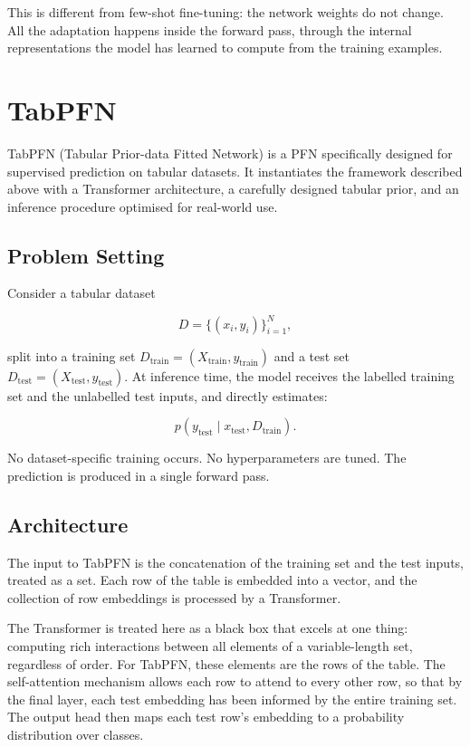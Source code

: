 \documentclass[12pt]{article}
\begin{document}
This is different from few-shot fine-tuning: the network weights do not change. All the adaptation happens inside the forward pass, through the internal representations the model has learned to compute from the training examples.

\section{TabPFN}

TabPFN (Tabular Prior-data Fitted Network) \cite{hollmann2023tabpfn, hollmann2025tabpfn} is a PFN specifically designed for supervised prediction on tabular datasets. It instantiates the framework described above with a Transformer architecture, a carefully designed tabular prior, and an inference procedure optimised for real-world use.

\subsection{Problem Setting}

Consider a tabular dataset

\[
D = \{(x_i, y_i)\}_{i=1}^N,
\]

split into a training set $D_{\text{train}} = (X_{\text{train}}, y_{\text{train}})$ and a test set $D_{\text{test}} = (X_{\text{test}}, y_{\text{test}})$. At inference time, the model receives the labelled training set and the unlabelled test inputs, and directly estimates:

\[
p(y_{\text{test}} \mid x_{\text{test}}, D_{\text{train}}).
\]

No dataset-specific training occurs. No hyperparameters are tuned. The prediction is produced in a single forward pass.

\subsection{Architecture}

The input to TabPFN is the concatenation of the training set and the test inputs, treated as a set. Each row of the table is embedded into a vector, and the collection of row embeddings is processed by a Transformer.

The Transformer is treated here as a black box that excels at one thing: computing rich interactions between all elements of a variable-length set, regardless of order. For TabPFN, these elements are the rows of the table. The self-attention mechanism allows each row to attend to every other row, so that by the final layer, each test embedding has been informed by the entire training set. The output head then maps each test row's embedding to a probability distribution over classes.
\end{document}
